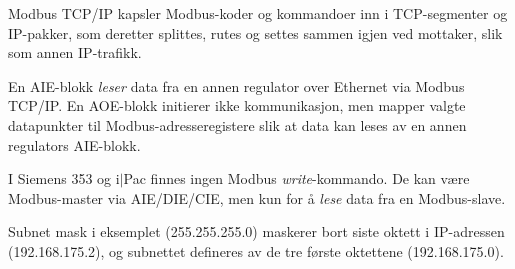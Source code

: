 Modbus TCP/IP kapsler Modbus-koder og kommandoer inn i TCP-segmenter og IP-pakker, som deretter splittes, rutes og settes sammen igjen ved mottaker, slik som annen IP-trafikk.

\vskip 10pt

En AIE-blokk {\it leser} data fra en annen regulator over Ethernet via Modbus TCP/IP. En AOE-blokk initierer ikke kommunikasjon, men mapper valgte datapunkter til Modbus-adresseregistere slik at data kan leses av en annen regulators AIE-blokk.

I Siemens 353 og i$|$Pac finnes ingen Modbus {\it write}-kommando. De kan være Modbus-master via AIE/DIE/CIE, men kun for å {\it lese} data fra en Modbus-slave.

\vskip 10pt

Subnet mask i eksemplet (255.255.255.0) maskerer bort siste oktett i IP-adressen (192.168.175.2), og subnettet defineres av de tre første oktettene (192.168.175.0).


